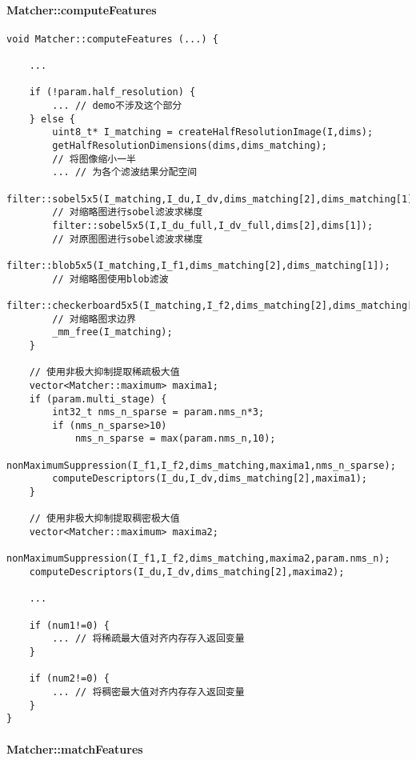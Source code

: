 \documentclass[UTF8]{ctexart}
\begin{document}
    \paragraph{Matcher::computeFeatures}
    \begin{verbatim}
void Matcher::computeFeatures (...) {
  
    ...

    if (!param.half_resolution) {
        ... // demo不涉及这个部分
    } else {
        uint8_t* I_matching = createHalfResolutionImage(I,dims);
        getHalfResolutionDimensions(dims,dims_matching);
        // 将图像缩小一半
        ... // 为各个滤波结果分配空间
        filter::sobel5x5(I_matching,I_du,I_dv,dims_matching[2],dims_matching[1]);
        // 对缩略图进行sobel滤波求梯度
        filter::sobel5x5(I,I_du_full,I_dv_full,dims[2],dims[1]);
        // 对原图图进行sobel滤波求梯度
        filter::blob5x5(I_matching,I_f1,dims_matching[2],dims_matching[1]);
        // 对缩略图使用blob滤波
        filter::checkerboard5x5(I_matching,I_f2,dims_matching[2],dims_matching[1]);
        // 对缩略图求边界
        _mm_free(I_matching);
    }
    
    // 使用非极大抑制提取稀疏极大值
    vector<Matcher::maximum> maxima1;
    if (param.multi_stage) {
        int32_t nms_n_sparse = param.nms_n*3;
        if (nms_n_sparse>10)
            nms_n_sparse = max(param.nms_n,10);
        nonMaximumSuppression(I_f1,I_f2,dims_matching,maxima1,nms_n_sparse);
        computeDescriptors(I_du,I_dv,dims_matching[2],maxima1);
    }
    
    // 使用非极大抑制提取稠密极大值
    vector<Matcher::maximum> maxima2;
    nonMaximumSuppression(I_f1,I_f2,dims_matching,maxima2,param.nms_n);
    computeDescriptors(I_du,I_dv,dims_matching[2],maxima2);

    ...

    if (num1!=0) {
        ... // 将稀疏最大值对齐内存存入返回变量
    }
    
    if (num2!=0) {
        ... // 将稠密最大值对齐内存存入返回变量
    }
}

    \end{verbatim}
    \paragraph{Matcher::matchFeatures}
    
\end{document}
